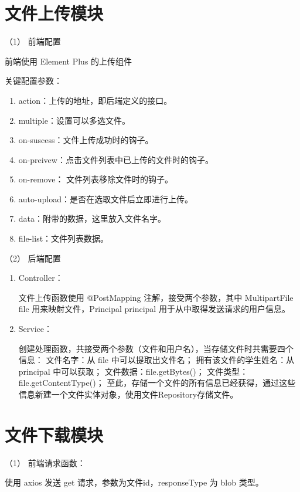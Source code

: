 \section{文件上传模块}

（1） 前端配置

前端使用 Element Plus 的上传组件

关键配置参数：
\begin{enumerate}[label=\circled{\arabic*}]
  \item action：上传的地址，即后端定义的接口。
  \item multiple：设置可以多选文件。
  \item on-suscess：文件上传成功时的钩子。
  \item on-preivew：点击文件列表中已上传的文件时的钩子。
  \item on-remove：	文件列表移除文件时的钩子。
  \item auto-upload：是否在选取文件后立即进行上传。
  \item data：附带的数据，这里放入文件名字。
  \item file-list：文件列表数据。
\end{enumerate}

（2） 后端配置

\begin{enumerate}[label=\circled{\arabic*}]
  \item Controller：

        文件上传函数使用 @PostMapping 注解，接受两个参数，其中 MultipartFile file 用来映射文件，Principal principal 用于从中取得发送请求的用户信息。

  \item Service：

        创建处理函数，共接受两个参数（文件和用户名），当存储文件时共需要四个信息：
        文件名字：从 file 中可以提取出文件名；
        拥有该文件的学生姓名：从 principal 中可以获取；
        文件数据：file.getBytes()；
        文件类型：file.getContentType()；
        至此，存储一个文件的所有信息已经获得，通过这些信息新建一个文件实体对象，使用文件Repository存储文件。

\end{enumerate}

\section{文件下载模块}

（1） 前端请求函数：

使用 axios 发送 get 请求，参数为文件id，responseType 为 blob 类型。

